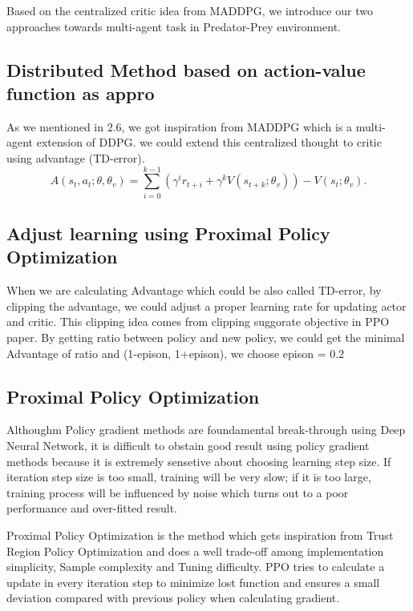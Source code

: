 \documentclass[11pt,twocolumn]{jarticle} %
\begin{document}
Based on the centralized critic idea from MADDPG, we introduce our two approaches towards multi-agent task in Predator-Prey environment.


\subsection{Distributed Method based on action-value function as appro}
As we mentioned in 2.6, we got inspiration from MADDPG which is a multi-agent extension of DDPG. we could extend this centralized thought to critic using advantage (TD-error).
\begin{equation}
A(s_t, a_t; \theta, \theta_v) = \sum_{i=0}^{k-1}(\gamma^i r_{t+i} + \gamma^k V(s_{t+k};\theta_v)) - V(s_t; \theta_v).
\end{equation}
\subsection{Adjust learning using Proximal Policy Optimization}
When we are calculating Advantage which could be also called TD-error, by clipping the advantage, we could adjust a proper learning rate for updating actor and critic. This clipping idea comes from clipping suggorate objective in PPO paper. By getting ratio between policy and new policy, we could get the minimal Advantage of ratio and (1-epison, 1+epison), we choose epison = 0.2

\subsection{Proximal Policy Optimization}
Althoughm Policy gradient methods are foundamental break-through using Deep Neural Network, it is difficult to obstain good result using policy gradient methods because it is extremely sensetive about choosing learning step size. If iteration step size is too small, training will be very slow; if it is too large, training process will be influenced by noise which turns out to a poor performance and over-fitted result. \par
Proximal Policy Optimization is the method which gets inspiration from Trust Region Policy Optimization and does a well trade-off among implementation simplicity, Sample complexity and Tuning difficulty. PPO tries to calculate a update in every iteration step to minimize lost function and ensures a small deviation compared with previous policy when calculating gradient.
\end{document}
